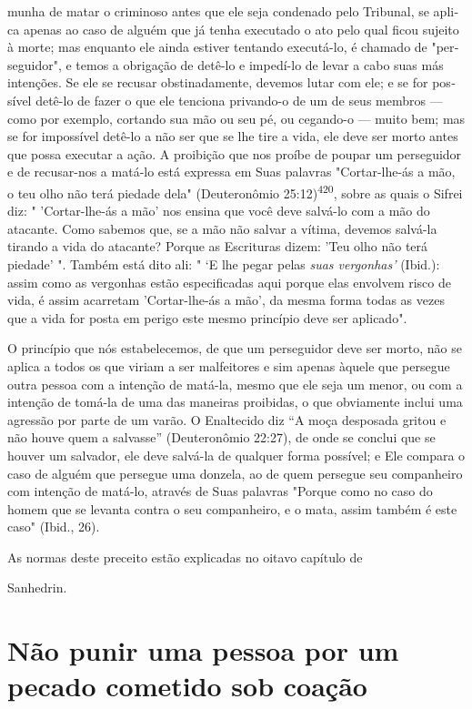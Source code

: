 munha de matar o criminoso antes que ele seja condenado pelo Tribunal,
se apli­ca apenas ao caso de alguém que já tenha executado o ato pelo
qual ficou sujeito à morte; mas enquanto ele ainda estiver tentando
executá-lo, é chamado de "per­seguidor", e temos a obrigação de detê-lo
e impedí-lo de levar a cabo suas más intenções. Se ele se recusar
obstinadamente, devemos lutar com ele; e se for pos­sível detê-lo de
fazer o que ele tenciona privando-o de um de seus membros ---como por
exemplo, cortando sua mão ou seu pé, ou cegando-o --- muito bem; mas se
for impossível detê-lo a não ser que se lhe tire a vida, ele deve ser
morto antes que possa executar a ação. A proibição que nos proíbe de
poupar um per­seguidor e de recusar-nos a matá-lo está expressa em Suas
palavras "Cortar-lhe-ás a mão, o teu olho não terá piedade dela"
(Deuteronômio 25:12)\textsuperscript{420}, sobre as quais o Sifrei diz:
" 'Cortar-lhe-ás a mão' nos ensina que você deve salvá-lo com a mão do
atacante. Como sabemos que, se a mão não salvar a vítima, devemos
salvá-la tirando a vida do atacante? Porque as Escrituras dizem: 'Teu
olho não terá piedade' ". Também está dito ali: " `E lhe pegar pelas
\emph{suas vergonhas'} (Ibid.): assim como as vergonhas estão
especificadas aqui porque elas envolvem risco de vida, é assim acarretam
'Cortar-lhe-ás a mão', da mesma forma todas as vezes que a vida for
posta em perigo este mesmo princípio deve ser aplicado".

O princípio que nós estabelecemos, de que um perseguidor deve ser morto,
não se aplica a todos os que viriam a ser malfeitores e sim apenas
àquele que persegue outra pessoa com a intenção de matá-la, mesmo que
ele seja um menor, ou com a intenção de tomá-la de uma das maneiras
proibidas, o que obviamente inclui uma agressão por parte de um varão. O
Enaltecido diz ``A moça desposada gritou e não houve quem a salvasse''
(Deuteronômio 22:27), de onde se conclui que se houver um salvador, ele
deve salvá-la de qualquer forma possível; e Ele compara o caso de alguém
que persegue uma donzela, ao de quem persegue seu companheiro com
intenção de matá-lo, através de Suas palavras "Porque como no caso do
homem que se levanta contra o seu companheiro, e o mata, assim também é
este caso" (Ibid., 26).


As normas deste preceito estão explicadas no oitavo capítulo de


Sanhedrin.

\section{Não punir uma pessoa por um pecado cometido sob coação}

